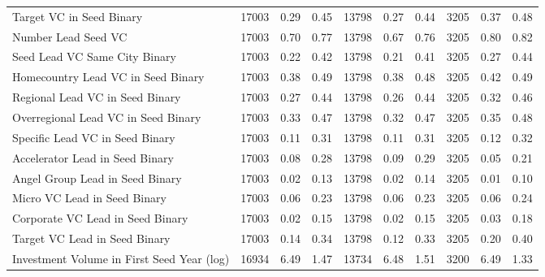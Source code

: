 \begin{table}[!h]
{\begin{tabular}[t]{lrrrrrrrrr}
Target VC in Seed Binary & 17003 & 0.29 & 0.45 & 13798 & 0.27 & 0.44 & 3205 & 0.37 & 0.48\\
Number Lead Seed VC & 17003 & 0.70 & 0.77 & 13798 & 0.67 & 0.76 & 3205 & 0.80 & 0.82\\
Seed Lead VC Same City Binary & 17003 & 0.22 & 0.42 & 13798 & 0.21 & 0.41 & 3205 & 0.27 & 0.44\\
Homecountry Lead VC in Seed Binary & 17003 & 0.38 & 0.49 & 13798 & 0.38 & 0.48 & 3205 & 0.42 & 0.49\\
\addlinespace
Regional Lead VC in Seed Binary & 17003 & 0.27 & 0.44 & 13798 & 0.26 & 0.44 & 3205 & 0.32 & 0.46\\
Overregional Lead VC in Seed Binary & 17003 & 0.33 & 0.47 & 13798 & 0.32 & 0.47 & 3205 & 0.35 & 0.48\\
Specific Lead VC in Seed Binary & 17003 & 0.11 & 0.31 & 13798 & 0.11 & 0.31 & 3205 & 0.12 & 0.32\\
Accelerator Lead in Seed Binary & 17003 & 0.08 & 0.28 & 13798 & 0.09 & 0.29 & 3205 & 0.05 & 0.21\\
Angel Group Lead in Seed Binary & 17003 & 0.02 & 0.13 & 13798 & 0.02 & 0.14 & 3205 & 0.01 & 0.10\\
\addlinespace
Micro VC Lead in Seed Binary & 17003 & 0.06 & 0.23 & 13798 & 0.06 & 0.23 & 3205 & 0.06 & 0.24\\
Corporate VC Lead in Seed Binary & 17003 & 0.02 & 0.15 & 13798 & 0.02 & 0.15 & 3205 & 0.03 & 0.18\\
Target VC Lead in Seed Binary & 17003 & 0.14 & 0.34 & 13798 & 0.12 & 0.33 & 3205 & 0.20 & 0.40\\
Investment Volume in First Seed Year (log) & 16934 & 6.49 & 1.47 & 13734 & 6.48 & 1.51 & 3200 & 6.49 & 1.33\\
\bottomrule
\end{tabular}}
\end{table}
